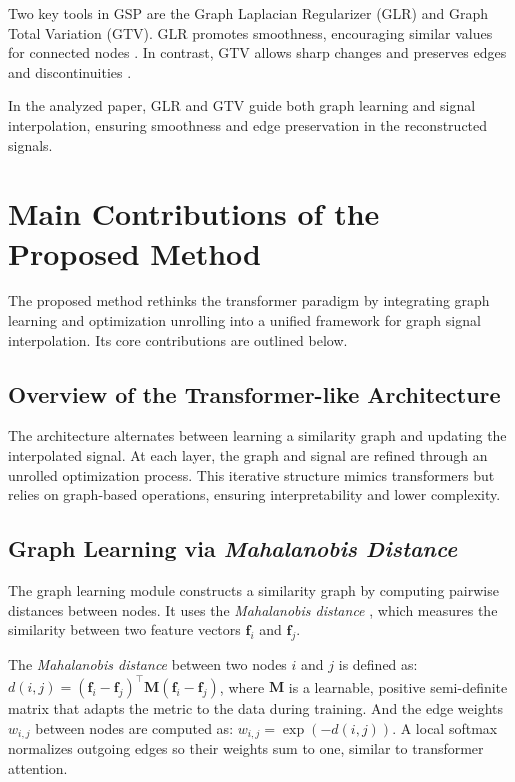 \documentclass{article}
\theoremstyle{plain}
\theoremstyle{definition}
\theoremstyle{remark}
\begin{document}
Two key tools in GSP are the Graph Laplacian Regularizer (GLR) and Graph Total Variation (GTV). GLR promotes smoothness, encouraging similar values for connected nodes \cite{ortega2018graph}. In contrast, GTV allows sharp changes and preserves edges and discontinuities \cite{cheung2018graph}.

In the analyzed paper, GLR and GTV guide both graph learning and signal interpolation, ensuring smoothness and edge preservation in the reconstructed signals.

\section{Main Contributions of the Proposed Method}

The proposed method rethinks the transformer paradigm by integrating graph learning and optimization unrolling into a unified framework for graph signal interpolation. Its core contributions are outlined below.

\subsection{Overview of the Transformer-like Architecture}

The architecture alternates between learning a similarity graph and updating the interpolated signal. At each layer, the graph and signal are refined through an unrolled optimization process. This iterative structure mimics transformers but relies on graph-based operations, ensuring interpretability and lower complexity.

\subsection{Graph Learning via \textit{Mahalanobis Distance}}

The graph learning module constructs a similarity graph by computing pairwise distances between nodes. It uses the \textit{Mahalanobis distance} \cite{hu2020feature}, which measures the similarity between two feature vectors $\mathbf{f}_i$ and $\mathbf{f}_j$.

The \textit{Mahalanobis distance} between two nodes $i$ and $j$ is defined as: $d(i, j) = (\mathbf{f}_i - \mathbf{f}_j)^\top \mathbf{M} (\mathbf{f}_i - \mathbf{f}_j)$, where $\mathbf{M}$ is a learnable, positive semi-definite matrix that adapts the metric to the data during training. And the edge weights $w_{i,j}$ between nodes are computed as: $w_{i,j} = \exp(-d(i,j)).$ A local softmax normalizes outgoing edges so their weights sum to one, similar to transformer attention.
\end{document}
